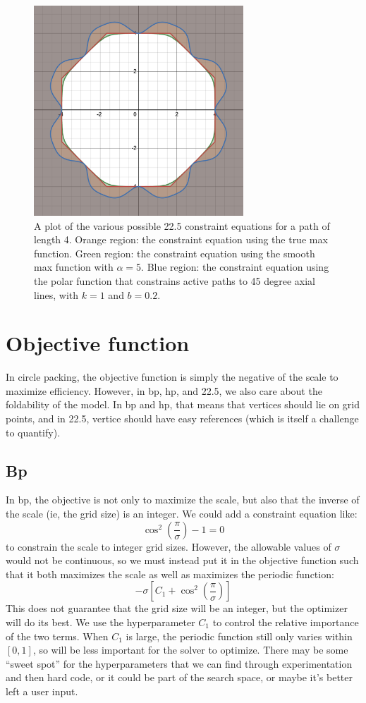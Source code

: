 \documentclass[12pt]{article}
\begin{document}
\begin{figure}[h]
    \centering
    \includegraphics[width=0.7\textwidth]{octagons.png}\caption{A plot of the various possible 22.5 constraint equations for a path of length 4. Orange region: the constraint equation using the true max function. Green region: the constraint equation using the smooth max function with $\alpha=5$. Blue region: the constraint equation using the polar function that constrains active paths to 45 degree axial lines, with $k=1$ and $b=0.2$.}\label{fig:octagons}
\end{figure}

\section{Objective function}
In circle packing, the objective function is simply the negative of the scale to maximize efficiency. However, in bp, hp, and 22.5, we also care about the foldability of the model. In bp and hp, that means that vertices should lie on grid points, and in 22.5, vertice should have easy references (which is itself a challenge to quantify).

\subsection{Bp}
In bp, the objective is not only to maximize the scale, but also that the inverse of the scale (ie, the grid size) is an integer. We could add a constraint equation like:
\[
    \cos^2(\frac{\pi}{\sigma}) - 1 = 0
\]
to constrain the scale to integer grid sizes. However, the allowable values of $\sigma$ would not be continuous, so we must instead put it in the objective function such that it both maximizes the scale as well as maximizes the periodic function:
\[
    -\sigma \left[C_1+\cos^2(\frac{\pi}{\sigma})\right]
\]
This does not guarantee that the grid size will be an integer, but the optimizer will do its best. We use the hyperparameter $C_1$ to control the relative importance of the two terms. When $C_1$ is large, the periodic function still only varies within $[0,1]$, so will be less important for the solver to optimize. There may be some ``sweet spot'' for the hyperparameters that we can find through experimentation and then hard code, or it could be part of the search space, or maybe it's better left a user input.
\end{document}
